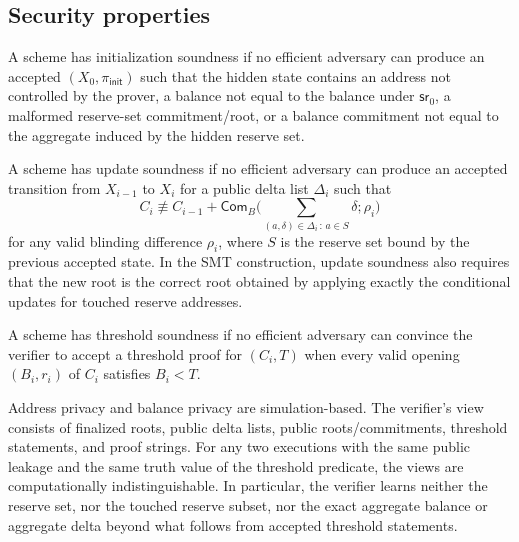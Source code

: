 \documentclass[runningheads]{llncs}
\newcommand{\Com}{\mathsf{Com}}
\newcommand{\sr}{\mathsf{sr}}
\newcommand{\dlist}{\Delta}
\begin{document}
\subsection{Security properties}

\begin{definitionx}
A scheme has initialization soundness if no efficient adversary can produce an accepted \((X_0,\pi_{\mathsf{init}})\) such that the hidden state contains an address not controlled by the prover, a balance not equal to the balance under \(\sr_0\), a malformed reserve-set commitment/root, or a balance commitment not equal to the aggregate induced by the hidden reserve set.
\end{definitionx}

\begin{definitionx}
A scheme has update soundness if no efficient adversary can produce an accepted transition from \(X_{i-1}\) to \(X_i\) for a public delta list \(\dlist_i\) such that
\[
        C_i \not\equiv C_{i-1}+\Com_B\Big(\sum_{(a,\delta)\in\dlist_i\,:\,a\in S}\delta;\rho_i\Big)
\]
for any valid blinding difference \(\rho_i\), where \(S\) is the reserve set bound by the previous accepted state.  In the SMT construction, update soundness also requires that the new root is the correct root obtained by applying exactly the conditional updates for touched reserve addresses.
\end{definitionx}

\begin{definitionx}
A scheme has threshold soundness if no efficient adversary can convince the verifier to accept a threshold proof for \((C_i,T)\) when every valid opening \((B_i,r_i)\) of \(C_i\) satisfies \(B_i<T\).
\end{definitionx}

\begin{definitionx}[Privacy]
Address privacy and balance privacy are simulation-based.  The verifier's view consists of finalized roots, public delta lists, public roots/commitments, threshold statements, and proof strings.  For any two executions with the same public leakage and the same truth value of the threshold predicate, the views are computationally indistinguishable.  In particular, the verifier learns neither the reserve set, nor the touched reserve subset, nor the exact aggregate balance or aggregate delta beyond what follows from accepted threshold statements.
\end{definitionx}
\end{document}
